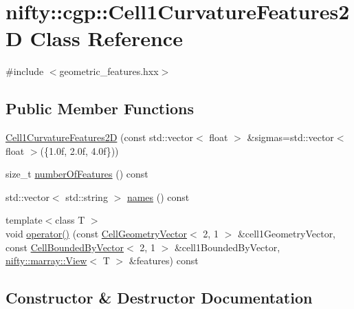 \hypertarget{classnifty_1_1cgp_1_1Cell1CurvatureFeatures2D}{}\section{nifty\+:\+:cgp\+:\+:Cell1\+Curvature\+Features2\+D Class Reference}
\label{classnifty_1_1cgp_1_1Cell1CurvatureFeatures2D}


{\ttfamily \#include $<$geometric\+\_\+features.\+hxx$>$}

\subsection*{Public Member Functions}
\begin{DoxyCompactItemize}
\item 
\hyperlink{classnifty_1_1cgp_1_1Cell1CurvatureFeatures2D_af6e4ca198685673a68f2252ae140927c}{Cell1\+Curvature\+Features2\+D} (const std\+::vector$<$ float $>$ \&sigmas=std\+::vector$<$ float $>$(\{1.\+0f, 2.\+0f, 4.\+0f\}))
\item 
size\+\_\+t \hyperlink{classnifty_1_1cgp_1_1Cell1CurvatureFeatures2D_a51a8d50734cb749a97f8444b152ded06}{number\+Of\+Features} () const 
\item 
std\+::vector$<$ std\+::string $>$ \hyperlink{classnifty_1_1cgp_1_1Cell1CurvatureFeatures2D_afdec5436850e78f2a70edb4033488f19}{names} () const 
\item 
{\footnotesize template$<$class T $>$ }\\void \hyperlink{classnifty_1_1cgp_1_1Cell1CurvatureFeatures2D_a01e82615ad4742e8d6c8b74771eb2f9f}{operator()} (const \hyperlink{classnifty_1_1cgp_1_1CellGeometryVector}{Cell\+Geometry\+Vector}$<$ 2, 1 $>$ \&cell1\+Geometry\+Vector, const \hyperlink{classnifty_1_1cgp_1_1CellBoundedByVector}{Cell\+Bounded\+By\+Vector}$<$ 2, 1 $>$ \&cell1\+Bounded\+By\+Vector, \hyperlink{classandres_1_1View}{nifty\+::marray\+::\+View}$<$ T $>$ \&features) const 
\end{DoxyCompactItemize}


\subsection{Constructor \& Destructor Documentation}
\hypertarget{classnifty_1_1cgp_1_1Cell1CurvatureFeatures2D_af6e4ca198685673a68f2252ae140927c}{}
